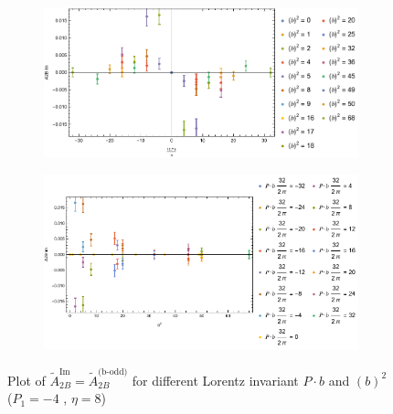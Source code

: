 \documentclass[]{article}
\numberwithin{equation}{section}
\newcommand{\tAmp}{\widetilde{A}}
\newcommand{\tAmp}{\ensuremath{\widetilde{A}^{(+)}}}
\begin{document}
\begin{figure}[h!]
     \centering
     \begin{subfigure}[b]{0.45\textwidth}
         \centering
         \includegraphics[width=\textwidth]{Amp_plots/bP_A2B_b_odd_P1_-4_eta_8.pdf}
     \end{subfigure}
     \begin{subfigure}[b]{0.45\textwidth}
         \centering
         \includegraphics[width=\textwidth]{Amp_plots/bsq_A2B_b_odd_P1_-4_eta_8.pdf}
     \end{subfigure}
        \caption{Plot of $\tAmp^{\text{Im}}_{2B}=\tAmp^{\text{(b-odd)}}_{2B}$ for different Lorentz invariant $P\cdot b$ and $(b)^2$  ($P_{1} = -4$ , $\eta=8$)}
\end{figure}
\end{document}
